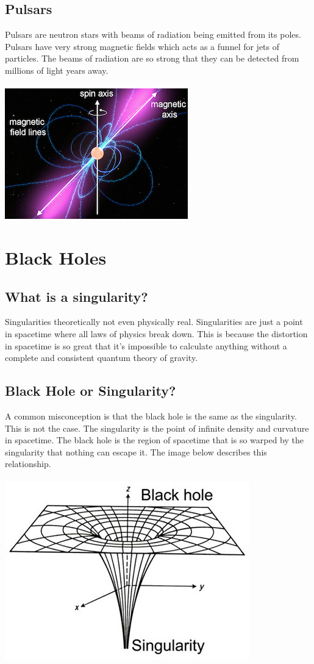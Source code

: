 \documentclass{article}
\begin{document}
\subsection{Pulsars}
Pulsars are neutron stars with beams of radiation being emitted from its poles. Pulsars have very strong magnetic fields which acts as a funnel for jets of particles. The beams of radiation are so strong that they can be detected from millions of light years away.\\\\
\includegraphics[scale=0.6]{images/pulsars.png}

\section{Black Holes}
\subsection{What is a singularity?}
Singularities theoretically not even physically real. Singularities are just a point in spacetime where all laws of physics break down. This is because the distortion in spacetime is so great that it's impossible to calculate anything without a complete and consistent quantum theory of gravity.

\subsection{Black Hole or Singularity?}
A common misconception is that the black hole is the same as the singularity. This is not the case. The singularity is the point of infinite density and curvature in spacetime. The black hole is the region of spacetime that is so warped by the singularity that nothing can escape it. The image below describes this relationship.\\\\
\includegraphics[scale=0.5]{images/black_hole.png}
\end{document}

